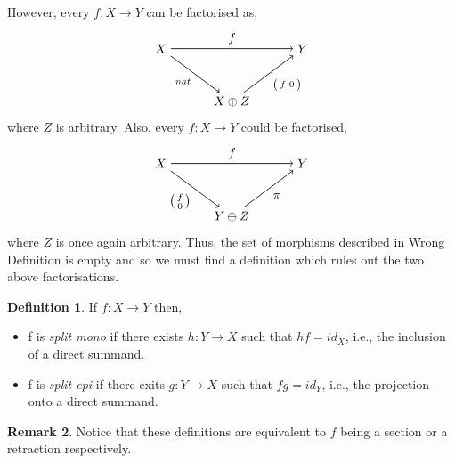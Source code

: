 \documentclass[11.5pt, twoside, a4paper, titlepage]{report}
\theoremstyle{definition}
\newtheorem{mydef}{Definition}[section]
\newtheorem{rem}[mydef]{Remark}
\theoremstyle{plain}
\begin{document}
\noindent
However, every $f:X \to Y$ can be factorised as,
\begin{equation*}
\begin{tikzpicture}[->,-latex, auto, main path/.style={->, semithick}, main node/.style={}]
\node	[main node]		(1) at (0,0)		{$X$};
\node [main node]		(2) at (4,0)		{$Y$};
\node [main node]		(3) at (2,-1.5)	{$X\oplus Z$};

\draw (1) [main path] edge node [auto] {$f$} (2);
\draw (1) [main path] edge node [auto, swap] {$\scriptstyle{nat}$} (3);
\draw (3) [main path] edge node [auto, swap] {$\left(\begin{smallmatrix}f & 0 \end{smallmatrix}\right)$} (2);
\end{tikzpicture}
\end{equation*}
where $Z$ is arbitrary. Also, every $f: X \to Y$ could be factorised, 
\begin{equation*}
\begin{tikzpicture}[->,-latex, auto, main path/.style={->, semithick}, main node/.style={}]
\node	[main node]		(1) at (0,0)		{$X$};
\node [main node]		(2) at (4,0)		{$Y$};
\node [main node]		(3) at (2,-1.5)	{$Y\oplus Z$};

\draw (1) [main path] edge node [auto] {$f$} (2);
\draw (1) [main path] edge node [auto, swap] {$\left(\begin{smallmatrix}f \\ 0 \end{smallmatrix}\right)$} (3);
\draw (3) [main path] edge node [auto, swap] {$\pi$} (2);
\end{tikzpicture}
\end{equation*}
where $Z$ is once again arbitrary.
Thus, the set of morphisms described in Wrong Definition is empty and so we must find a definition which rules out the two above factorisations.

\begin{mydef}
If $f: X \to Y$ then,
\begin{itemize}
\item f is \emph{split mono} if there exists $h: Y \to X$ such that $hf=id_X$, i.e., the inclusion of a direct summand.
\item f is \emph{split epi} if there exits $g: Y \to X$ such that $fg=id_Y$, i.e., the projection onto a direct summand.
\end{itemize}
\end{mydef}

\begin{rem}
Notice that these definitions are equivalent to $f$ being a section or a retraction respectively.
\end{rem}
\end{document}
